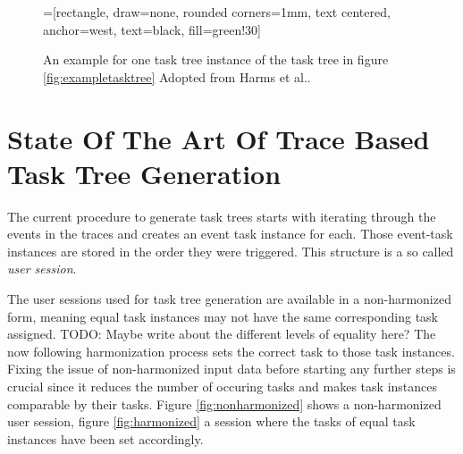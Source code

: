 	\begin{figure}
		=[rectangle, draw=none, rounded corners=1mm,
		        text centered, anchor=west, text=black, fill=green!30]

		\caption{An example for one task tree instance of the task tree in figure \ref{fig:exampletasktree} Adopted from Harms et al.\cite{harms2013}.}
		\label{fig:exampletaskinstancetree}
	\end{figure}

\section{State Of The Art Of Trace Based Task Tree Generation}
The current procedure to generate task trees\cite{harms2013} starts with iterating through the events in the traces and creates an event task instance for each.
Those event-task instances are stored in the order they were triggered.  This structure is a so called \textit{user session}.

The user sessions used for task tree generation are available in a non-harmonized form,
meaning equal task instances may not have the same corresponding task assigned. TODO: Maybe write about the different levels of equality here?
The now following harmonization process sets the correct task to those task instances.
Fixing the issue of non-harmonized input data before starting any further steps is crucial since it reduces the number of occuring tasks and makes task instances
comparable by their tasks. Figure \ref{fig:nonharmonized} shows a non-harmonized user session, figure \ref{fig:harmonized} a session where the tasks of equal task instances have been set accordingly.


